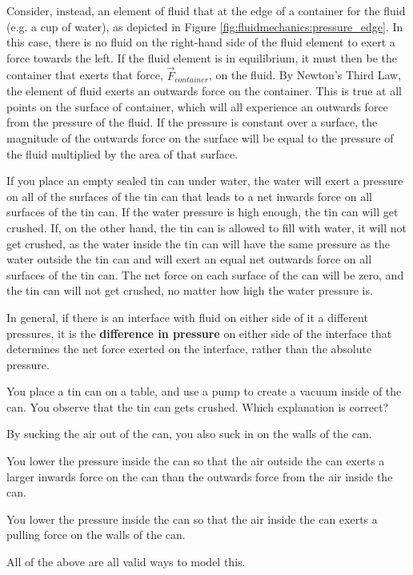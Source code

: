 Consider, instead, an element of fluid that at the edge of a container for the fluid (e.g. a cup of water), as depicted in Figure \ref{fig:fluidmechanics:pressure_edge}.
In this case, there is no fluid on the right-hand side of the fluid element to exert a force towards the left. If the fluid element is in equilibrium, it must then be the container that exerts that force, $\vec F_{container}$, on the fluid. By Newton's Third Law, the element of fluid exerts an outwards force on the container. This is true at all points on the surface of container, which will all experience an outwards force from the pressure of the fluid. If the pressure is constant over a surface, the magnitude of the outwards force on the surface will be equal to the pressure of the fluid multiplied by the area of that surface. 

If you place an empty sealed tin can under water, the water will exert a pressure on all of the surfaces of the tin can that leads to a net inwards force on all surfaces of the tin can. If the water pressure is high enough, the tin can will get crushed. If, on the other hand, the tin can is allowed to fill with water, it will not get crushed, as the water inside the tin can will have the same pressure as the water outside the tin can and will exert an equal net outwards force on all surfaces of the tin can. The net force on each surface of the can will be zero, and the tin can will not get crushed, no matter how high the water pressure is. 

In general, if there is an interface with fluid on either side of it a different pressures, it is the \textbf{difference in pressure} on either side of the interface that determines the net force exerted on the interface, rather than the absolute pressure.

\begin{checkpoint}
\begin{MCquestion}{You place a tin can on a table, and use a pump to create a vacuum inside of the can. You observe that the tin can gets crushed. Which explanation is correct?}
\item By sucking the air out of the can, you also suck in on the walls of the can. 
\item You lower the pressure inside the can so that the air outside the can exerts a larger inwards force on the can than the outwards force from the air inside the can. \correct
\item You lower the pressure inside the can so that the air inside the can exerts a pulling force on the walls of the can.
\item All of the above are all valid ways to model this. 
\end{MCquestion}
\end{checkpoint}

